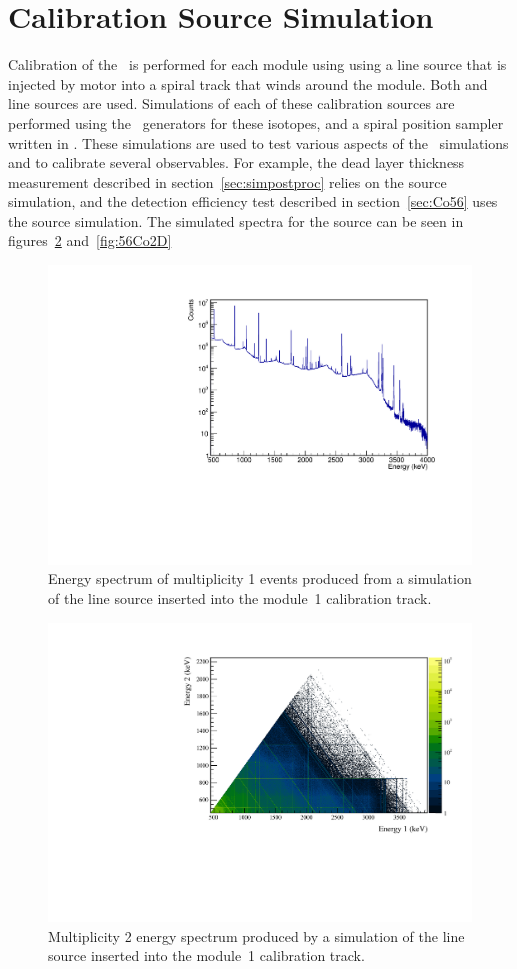 \documentclass[/main.tex]{subfiles}
\begin{document}
\section{Calibration Source Simulation}
Calibration of the \MJD\ is performed for each module using using a line source that is injected by motor into a spiral track that winds around the module.
Both  and  line sources are used.
Simulations of each of these calibration sources are performed using the \geant\ generators for these isotopes, and a spiral position sampler written in \Mage.
These simulations are used to test various aspects of the \Mage\ simulations and to calibrate several observables.
For example, the dead layer thickness measurement described in section~\ref{sec:simpostproc} relies on the  source simulation, and the detection efficiency test described in section~\ref{sec:Co56} uses the  source simulation.
The simulated spectra for the  source can be seen in figures~\ref{fig:56Co1D} and~\ref{fig:56Co2D}
\begin{figure}
  \centering
  \includegraphics[width=.8\linewidth]{Co56Sim1D}
  \caption[Simulation of multiplicty 1 events from  line source]{ \label{fig:56Co1D}
    Energy spectrum of multiplicity 1 events produced from a simulation of the  line source inserted into the module~1 calibration track.
  }
\end{figure}

\begin{figure}
  \centering
  \includegraphics[width=.8\linewidth]{Co56Sim2D}
  \caption[Simulation of multiplicty 2 events from  line source]{ \label{fig:56Co1D}
    Multiplicity 2 energy spectrum produced by a simulation of the  line source inserted into the module~1 calibration track.
  }
\end{figure}
\end{document}
